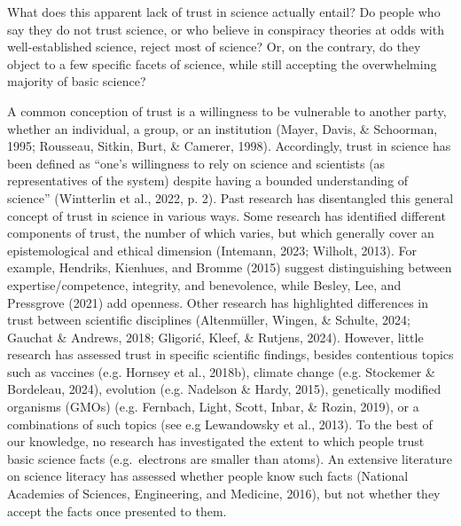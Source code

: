 \documentclass[
  doc,floatsintext]{apa6}
\begin{document}
What does this apparent lack of trust in science actually entail? Do people who say they do not trust science, or who believe in conspiracy theories at odds with well-established science, reject most of science? Or, on the contrary, do they object to a few specific facets of science, while still accepting the overwhelming majority of basic science?

A common conception of trust is a willingness to be vulnerable to another party, whether an individual, a group, or an institution (Mayer, Davis, \& Schoorman, 1995; Rousseau, Sitkin, Burt, \& Camerer, 1998). Accordingly, trust in science has been defined as ``one's willingness to rely on science and scientists (as representatives of the system) despite having a bounded understanding of science'' (Wintterlin et al., 2022, p. 2). Past research has disentangled this general concept of trust in science in various ways. Some research has identified different components of trust, the number of which varies, but which generally cover an epistemological and ethical dimension (Intemann, 2023; Wilholt, 2013). For example, Hendriks, Kienhues, and Bromme (2015) suggest distinguishing between expertise/competence, integrity, and benevolence, while Besley, Lee, and Pressgrove (2021) add openness. Other research has highlighted differences in trust between scientific disciplines (Altenmüller, Wingen, \& Schulte, 2024; Gauchat \& Andrews, 2018; Gligorić, Kleef, \& Rutjens, 2024). However, little research has assessed trust in specific scientific findings, besides contentious topics such as vaccines (e.g. Hornsey et al., 2018b), climate change (e.g. Stockemer \& Bordeleau, 2024), evolution (e.g. Nadelson \& Hardy, 2015), genetically modified organisms (GMOs) (e.g. Fernbach, Light, Scott, Inbar, \& Rozin, 2019), or a combinations of such topics (see e.g Lewandowsky et al., 2013). To the best of our knowledge, no research has investigated the extent to which people trust basic science facts (e.g.~electrons are smaller than atoms). An extensive literature on science literacy has assessed whether people know such facts (National Academies of Sciences, Engineering, and Medicine, 2016), but not whether they accept the facts once presented to them.
\end{document}
